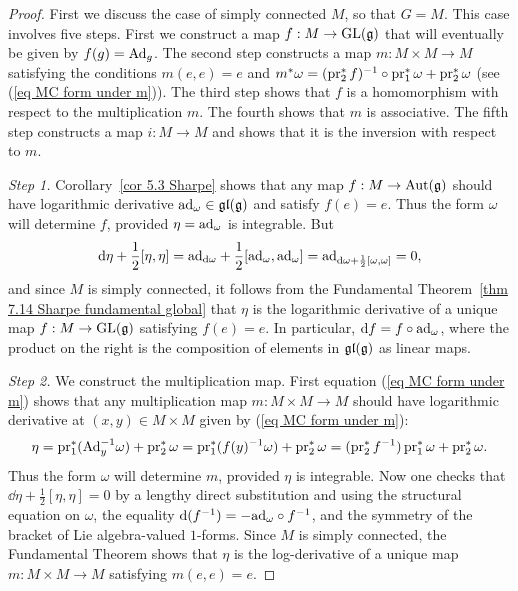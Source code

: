 \begin{proof}
    First we discuss the case of simply connected $M$, so that $G=M$. This case involves five steps. First we construct a map $f:M\to \operatorname{GL}(\mathfrak{g})$ that will eventually be given by $f(g)=\mathrm{Ad}_g$. The second step constructs a map $m:M\times M\to M$ satisfying the conditions $m(e,e)=e$ and $m^\ast \omega=(\operatorname{pr}_2^\ast f)^{-1} \circ \operatorname{pr}_1^\ast\omega+\operatorname{pr}_2^\ast\omega$ (see (\ref{eq MC form under m})). The third step shows that $f$ is a homomorphism with respect to the multiplication $m$. The fourth shows that $m$ is associative. The fifth step constructs a map $i:M\to M$ and shows that it is the inversion with respect to $m$.

    \emph{Step 1.} Corollary~\ref{cor 5.3 Sharpe} shows that any map $f:M\to \operatorname{Aut}(\mathfrak{g})$ should have logarithmic derivative $\mathrm{ad}_{\omega}\in \mathfrak{gl}(\mathfrak{g})$ and satisfy $f(e)=e$. Thus the form $\omega$ will determine $f$, provided $\eta=\mathrm{ad}_\omega$ is integrable. But
    \[{\mathrm{d}}\eta+\frac12[\eta,\eta]=\mathrm{ad}_{{\mathrm{d}}\omega}+\frac12[\mathrm{ad}_\omega,\mathrm{ad}_\omega]=\mathrm{ad}_{{\mathrm{d}}\omega+\frac12[\omega,\omega]}=0,\]
    and since $M$ is simply connected, it follows from the Fundamental Theorem~\ref{thm 7.14 Sharpe fundamental global} that $\eta$ is the logarithmic derivative of a unique map $f:M\to \operatorname{GL}(\mathfrak{g})$ satisfying $f(e)=e$. In particular, ${\mathrm{d}} f=f\circ \mathrm{ad}_\omega$, where the product on the right is the composition of elements in $\mathfrak{gl}(\mathfrak{g})$ as linear maps.

    \emph{Step 2.} We construct the multiplication map. First equation (\ref{eq MC form under m}) shows that any multiplication map $m:M\times M\to M$ should have logarithmic derivative at $(x,y)\in M\times M$ given by (\ref{eq MC form under m}):
    \[\eta=\operatorname{pr}_1^\ast(\mathrm{Ad}_y^{-1}\omega)+\operatorname{pr}_2^\ast\omega=\operatorname{pr}_1^\ast (f(y)^{-1}\omega)+\operatorname{pr}_2^\ast\omega=(\operatorname{pr}_2^\ast f^{-1})\operatorname{pr}_1^\ast\omega+\operatorname{pr}_2^\ast\omega.\]
    Thus the form $\omega$ will determine $m$, provided $\eta$ is integrable. Now one checks that $\dd\eta+\frac12[\eta,\eta]=0$ by a lengthy direct substitution and using the structural equation on $\omega$, the equality ${\mathrm{d}} (f^{-1})=-\mathrm{ad}_\omega\circ f^{-1}$, and the symmetry of the bracket of Lie algebra-valued $1$-forms. Since $M$ is simply connected, the Fundamental Theorem shows that $\eta$ is the log-derivative of a unique map $m:M\times M\to M$ satisfying $m(e,e)=e$.


\end{proof}
